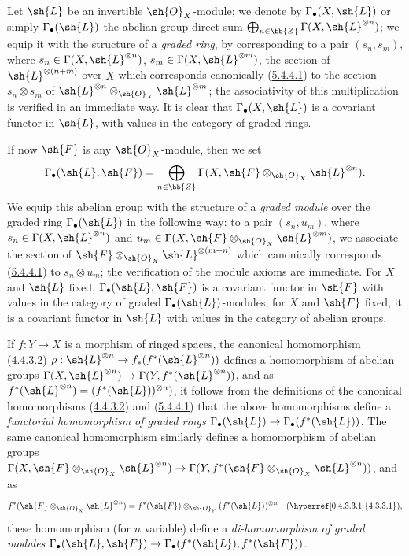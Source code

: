 \begin{env}[5.4.6]
\label{0.5.4.6}
Let $\sh{L}$ be an invertible $\sh{O}_X$-module; we denote by $\Gamma_\bullet(X,\sh{L})$ or simply $\Gamma_\bullet(\sh{L})$ the abelian group direct sum $\bigoplus_{n\in\bb{Z}}\Gamma(X,\sh{L}^{\otimes n})$;
we equip it with the structure of a \emph{graded ring}, by corresponding to a pair $(s_n,s_m)$, where $s_n\in\Gamma(X,\sh{L}^{\otimes n})$, $s_m\in\Gamma(X,\sh{L}^{\otimes m})$, the section of $\sh{L}^{\otimes(n+m)}$ over $X$ which corresponds canonically (\hyperref[0.5.4.4.1]{5.4.4.1}) to the section $s_n\otimes s_m$ of $\sh{L}^{\otimes n}\otimes_{\sh{O}_X}\sh{L}^{\otimes m}$;
the associativity of this multiplication is verified in an immediate way.
It is clear that $\Gamma_\bullet(X,\sh{L})$ is a covariant functor in $\sh{L}$, with values in the category of graded rings.

If now $\sh{F}$ is any $\sh{O}_X$-module, then we set
\[
  \Gamma_\bullet(\sh{L},\sh{F})=\bigoplus_{n\in\bb{Z}}\Gamma(X,\sh{F}\otimes_{\sh{O}_X}\sh{L}^{\otimes n}).
\]
We equip this abelian group with the structure of a \emph{graded module} over the graded ring $\Gamma_\bullet(\sh{L})$ in the following way:
to a pair $(s_n,u_m)$, where $s_n\in\Gamma(X,\sh{L}^{\otimes n})$ and $u_m\in\Gamma(X,\sh{F}\otimes_{\sh{O}_X}\sh{L}^{\otimes m})$, we associate the section of $\sh{F}\otimes_{\sh{O}_X}\sh{L}^{\otimes(m+n)}$ which canonically corresponds (\hyperref[0.5.4.4.1]{5.4.4.1}) to $s_n\otimes u_m$;
the verification of the module axioms are immediate.
For $X$ and $\sh{L}$ fixed, $\Gamma_\bullet(\sh{L},\sh{F})$ is a covariant functor in $\sh{F}$ with values in the category of graded $\Gamma_\bullet(\sh{L})$-modules;
for $X$ and $\sh{F}$ fixed, it is a covariant functor in $\sh{L}$ with values in the category of abelian groups.

If $f:Y\to X$ is a morphism of ringed spaces, the canonical homomorphism (\hyperref[0.4.4.3.2]{4.4.3.2}) $\rho:\sh{L}^{\otimes n}\to f_*(f^*(\sh{L}^{\otimes n}))$ defines a homomorphism of abelian groups $\Gamma(X,\sh{L}^{\otimes n})\to\Gamma(Y,f^*(\sh{L}^{\otimes n}))$, and as $f^*(\sh{L}^{\otimes n})=(f^*(\sh{L}))^{\otimes n})$, it follows from the definitions of the canonical homomorphisms (\hyperref[0.4.4.3.2]{4.4.3.2}) and (\hyperref[0.5.4.4.1]{5.4.4.1}) that the above homomorphisms define a \emph{functorial homomorphism of graded rings $\Gamma_\bullet(\sh{L})\to\Gamma_\bullet(f^*(\sh{L}))$}.
The same canonical homomorphism  similarly defines a homomorphism of abelian groups $\Gamma(X,\sh{F}\otimes_{\sh{O}_X}\sh{L}^{\otimes n})\to\Gamma(Y,f^*(\sh{F}\otimes_{\sh{O}_X}\sh{L}^{\otimes n}))$, and as
\[
  f^*(\sh{F}\otimes_{\sh{O}_X}\sh{L}^{\otimes n})=f^*(\sh{F})\otimes_{\sh{O}_Y}(f^*(\sh{L}))^{\otimes n}
  \quad(\hyperref[0.4.3.3.1]{4.3.3.1}),
\]
these homomorphism (for $n$ variable) define a \emph{di-homomorphism of graded modules $\Gamma_\bullet(\sh{L},\sh{F})\to\Gamma_\bullet(f^*(\sh{L}),f^*(\sh{F}))$}.
\end{env}

